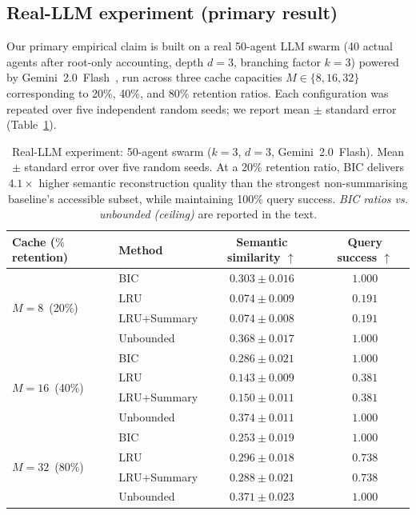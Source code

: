 \documentclass[fleqn,10pt]{article}
\theoremstyle{definition}
\newcommand{\slots}{M}
\begin{document}
\subsection*{Real-LLM experiment (primary result)}

Our primary empirical claim is built on a real 50-agent LLM swarm (40
actual agents after root-only accounting, depth $d{=}3$, branching
factor $k{=}3$) powered by Gemini~2.0~Flash~\citep{team2024gemini},
run across three cache capacities $\slots \in \{8, 16, 32\}$
corresponding to 20\%, 40\%, and 80\% retention ratios. Each
configuration was repeated over five independent random seeds; we
report mean $\pm$ standard error (Table~\ref{tab:llm}).

\begin{table}[t]
\centering
\caption{Real-LLM experiment: 50-agent swarm ($k{=}3$, $d{=}3$,
Gemini~2.0~Flash). Mean $\pm$ standard error over five random
seeds. At a 20\% retention ratio, BIC delivers $4.1\times$ higher
semantic reconstruction quality than the strongest non-summarising
baseline's accessible subset, while maintaining 100\% query success.
\emph{BIC ratios vs. unbounded (ceiling)} are reported in the text.
\label{tab:llm}}
\begin{tabular}{llcc}
\toprule
\textbf{Cache ($\%$ retention)} & \textbf{Method} &
  \textbf{Semantic similarity} $\uparrow$ & \textbf{Query success} $\uparrow$ \\
\midrule
\multirow{4}{*}{$\slots{=}8$\ (20\%)}
  & BIC         & $\mathbf{0.303 \pm 0.016}$ & $\mathbf{1.000}$ \\
  & LRU         & $0.074 \pm 0.009$          & $0.191$ \\
  & LRU+Summary & $0.074 \pm 0.008$          & $0.191$ \\
  & Unbounded   & $0.368 \pm 0.017$          & $1.000$ \\
\midrule
\multirow{4}{*}{$\slots{=}16$\ (40\%)}
  & BIC         & $\mathbf{0.286 \pm 0.021}$ & $\mathbf{1.000}$ \\
  & LRU         & $0.143 \pm 0.009$          & $0.381$ \\
  & LRU+Summary & $0.150 \pm 0.011$          & $0.381$ \\
  & Unbounded   & $0.374 \pm 0.011$          & $1.000$ \\
\midrule
\multirow{4}{*}{$\slots{=}32$\ (80\%)}
  & BIC         & $0.253 \pm 0.019$          & $\mathbf{1.000}$ \\
  & LRU         & $\mathbf{0.296 \pm 0.018}$ & $0.738$ \\
  & LRU+Summary & $0.288 \pm 0.021$          & $0.738$ \\
  & Unbounded   & $0.371 \pm 0.023$          & $1.000$ \\
\bottomrule
\end{tabular}
\end{table}
\end{document}
